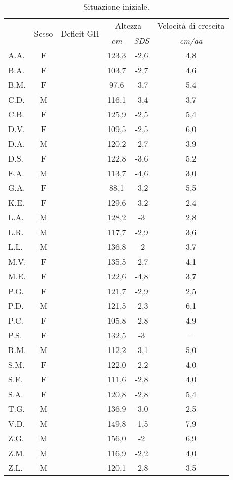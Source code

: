 \begin{table}[!h]
\begin{center}
\begin{tabular}{lccccc}
\toprule
 & \multirow{2}{*}{Sesso} & \multirow{2}{*}{Deficit GH} & \multicolumn{2}{c}{Altezza} & \multicolumn{1}{c}{Velocità di crescita} \\
 \cmidrule(r){4-5}
 & &   							& \emph{cm}      & \emph{SDS} & \emph{cm/aa}	 \\
\midrule
A.A.	& F &  				 		& 123,3 & -2,6 & 4,8 \\
B.A.	& F & \checkmark 	  			& 103,7 & -2,7 & 4,6  \\
B.M.	& F & \checkmark 	  			&  97,6 & -3,7 & 5,4 \\
C.D.	& M & \checkmark 	  			& 116,1 & -3,4 & 3,7 \\
C.B.	& F &  				 	        & 125,9 & -2,5 & 5,4 \\
D.V.	& F & \checkmark 	  			& 109,5 & -2,5 & 6,0  \\
D.A.	& M &  				  		& 120,2 & -2,7 & 3,9 \\
D.S.	& F & \checkmark 	  			& 122,8 & -3,6 & 5,2 \\
E.A.	& M &  				  		& 113,7 & -4,6 & 3,0 \\
G.A.	& F &  				  		&  88,1 & -3,2 & 5,5 \\
K.E.	& F &  				  		& 129,6 & -3,2 & 2,4  \\
L.A.	& M & \checkmark 	  			& 128,2 & -3   & 2,8 \\
L.R.	& M &  				  		& 117,7 & -2,9 & 3,6 \\
L.L.	& M &  				  		& 136,8 & -2   & 3,7  \\
M.V.	& F & \checkmark 	  			& 135,5 & -2,7 & 4,1 \\
M.E.	& F &  				  		& 122,6 & -4,8 & 3,7 \\
P.G.	& F & \checkmark 	  			& 121,7 & -2,9 & 2,5 \\
P.D.	& M &  				  		& 121,5 & -2,3 & 6,1 \\
P.C.	& F &  				  		& 105,8 & -2,8 & 4,9  \\
P.S.	& F &  				  		& 132,5 & -3   & --  \\
R.M.	& M & \checkmark 	  			& 112,2 & -3,1 & 5,0 \\
S.M.	& F & \checkmark 	  			& 122,0 & -2,2 & 4,0 \\
S.F.	& F &  				  		& 111,6 & -2,8 & 4,0 \\
S.A.	& F &  				  		& 120,8 & -2,8 & 5,4 \\
T.G.    & M &                       & 136,9 & -3,0 & 2,5 \\
V.D.	& M &  				  		& 149,8 & -1,5 & 7,9 \\
Z.G.	& M &  				  		& 156,0 & -2   & 6,9  \\
Z.M.	& M &  				  		& 116,9 & -2,2 & 4,0 \\
Z.L.	& M &  				  		& 120,1 & -2,8 & 3,5 \\
\bottomrule
\end{tabular}
\end{center}
\caption{Situazione iniziale.}
\label{tab:SituazioneIniziale}
\end{table}


